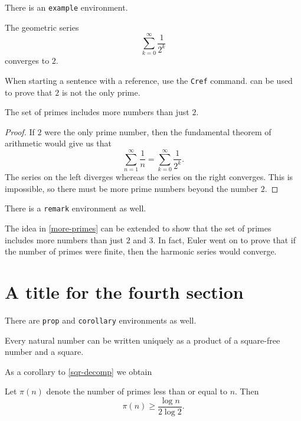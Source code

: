 \documentclass{rhumj_new}
\begin{document}
There is an \texttt{example} environment.

\begin{exa} \label{geo-series} The geometric series
\[ \sum_{k=0}^{\infty} \frac{1}{2^k} \]
converges to $2$.
\end{exa}

When starting a sentence with a reference, use the \texttt{Cref} command.  can be used to prove that $2$ is not the only prime.

\begin{thm} \label{more-primes} The set of primes includes more numbers than just $2$.
\end{thm}

\begin{proof}
If $2$ were the only prime number, then the fundamental theorem of arithmetic would give us that
\[ \sum_{n=1}^{\infty} \frac{1}{n} = \sum_{k=0}^{\infty} \frac{1}{2^k}.\]
The series on the left diverges whereas the series on the right converges. This is impossible, so there must be more prime numbers beyond the number $2$.
\end{proof}

There is a \texttt{remark} environment as well.

\begin{remark} The idea in \cref{more-primes} can be extended to show that the set of primes includes more numbers than just $2$ and $3$. In fact, Euler went on to prove that if the number of primes were finite, then the harmonic series would converge.
\end{remark}

\section{A title for the fourth section}

There are \texttt{prop} and \texttt{corollary} environments as well.

\begin{prop} \label{sqr-decomp} Every natural number can be written uniquely as a product of a square-free number and a square.
\end{prop}

As a corollary to \cref{sqr-decomp} we obtain

\begin{corollary} \label{low-bound} Let $\pi(n)$ denote the number of primes less than or equal to $n$. Then
\[ \pi(n) \geq \frac{\log n}{2\log 2}.\]
\end{corollary}
\end{document}
